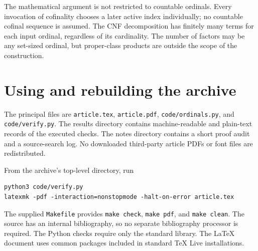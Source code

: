 \documentclass[11pt,letterpaper]{article}
\theoremstyle{definition}
\theoremstyle{remark}
\begin{document}
The mathematical argument is not restricted to countable ordinals.
Every invocation of cofinality chooses a later active index individually;
no countable cofinal sequence is assumed. The CNF decomposition has
finitely many terms for each input ordinal, regardless of its cardinality.
The number of factors may be any set-sized ordinal, but proper-class
products are outside the scope of the construction.

\section{Using and rebuilding the archive}\label{app:archive}

The principal files are \texttt{article.tex}, \texttt{article.pdf},
\texttt{code/ordinals.py}, and \texttt{code/verify.py}. The results directory
contains machine-readable and plain-text records of the executed checks.
The notes directory contains a short proof audit and a source-search log.
No downloaded third-party article PDFs or font files are redistributed.

From the archive's top-level directory, run
\begin{lstlisting}
python3 code/verify.py
latexmk -pdf -interaction=nonstopmode -halt-on-error article.tex
\end{lstlisting}
The supplied \texttt{Makefile} provides \texttt{make check},
\texttt{make pdf}, and \texttt{make clean}. The source has an internal
bibliography, so no separate bibliography processor is required. The
Python checks require only the standard library. The LaTeX document uses
common packages included in standard TeX Live installations.
\end{document}

